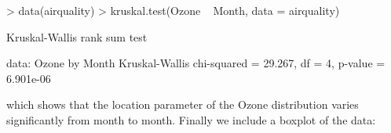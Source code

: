 \documentclass{article}
\begin{document}
\begin{Schunk}
\begin{Sinput}
> data(airquality)
> kruskal.test(Ozone ~ Month, data = airquality)
\end{Sinput}
\begin{Soutput}
	Kruskal-Wallis rank sum test

data:  Ozone by Month
Kruskal-Wallis chi-squared = 29.267, df = 4, p-value = 6.901e-06
\end{Soutput}
\end{Schunk}
which shows that the location parameter of the Ozone 
distribution varies significantly from month to month. Finally we
include a boxplot of the data:
\end{document}
